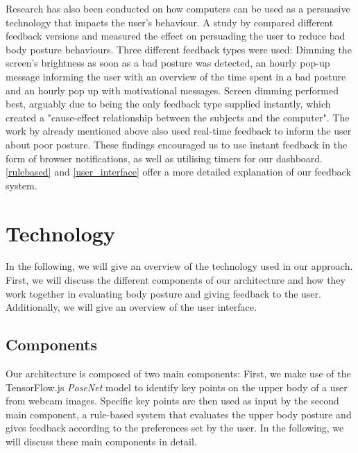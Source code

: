 Research has also been conducted on how computers can be used as a persuasive technology that impacts the user's behaviour\cite{fogg1998persuasive}.
A study by \citeauthor{duffy2013measuring} \cite{duffy2013measuring} compared different feedback versions and measured the effect on persuading the user to reduce bad body posture behaviours. Three different feedback types were used: Dimming the screen's brightness as soon as a bad posture was detected, an hourly pop-up message informing the user with an overview of the time spent in a bad posture and an hourly pop up with motivational messages\cite{duffy2013measuring}.
Screen dimming performed best, arguably due to being the only feedback type supplied instantly, which created a "cause-effect relationship between the subjects and the computer"\cite{duffy2013measuring}. The work by \citeauthor{jaimes2005sit} already mentioned above also used real-time feedback to inform the user about poor posture. These findings encouraged us to use instant feedback in the form of browser notifications, as well as utilising timers for our dashboard. \autoref{rulebased} and  \autoref{user_interface} offer a more detailed explanation of our feedback system.


\section{Technology} %
In the following, we will give an overview of the technology used in our approach. First, we will discuss the different components of our architecture and how they work together in evaluating body posture and giving feedback to the user. Additionally, we will give an overview of the user interface.

\subsection{Components} %
Our architecture is composed of two main components: First, we make use of the TensorFlow.js \textit{PoseNet} model to identify key points on the upper body of a user from webcam images. Specific key points are then used as input by the second main component, a rule-based system that evaluates the upper body posture and gives feedback according to the preferences set by the user. In the following, we will discuss these main components in detail.

